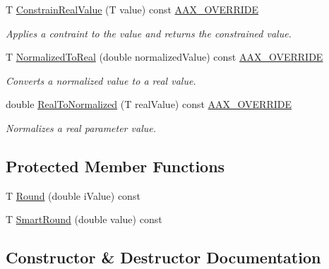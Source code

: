 \begin{DoxyCompactItemize}
T \mbox{\hyperlink{a01557_aecea5b86d9f5c6a5b1af87ba04d8473d}{Constrain\+Real\+Value}} (T value) const \mbox{\hyperlink{a00392_ac2f24a5172689ae684344abdcce55463}{A\+A\+X\+\_\+\+O\+V\+E\+R\+R\+I\+DE}}
\begin{DoxyCompactList}\small\item\em Applies a contraint to the value and returns the constrained value. \end{DoxyCompactList}\item 
T \mbox{\hyperlink{a01557_a50b58efa795c9973ab199d4f5bb31de4}{Normalized\+To\+Real}} (double normalized\+Value) const \mbox{\hyperlink{a00392_ac2f24a5172689ae684344abdcce55463}{A\+A\+X\+\_\+\+O\+V\+E\+R\+R\+I\+DE}}
\begin{DoxyCompactList}\small\item\em Converts a normalized value to a real value. \end{DoxyCompactList}\item 
double \mbox{\hyperlink{a01557_a457a42ac3e78debf4c595ac1afeec7cf}{Real\+To\+Normalized}} (T real\+Value) const \mbox{\hyperlink{a00392_ac2f24a5172689ae684344abdcce55463}{A\+A\+X\+\_\+\+O\+V\+E\+R\+R\+I\+DE}}
\begin{DoxyCompactList}\small\item\em Normalizes a real parameter value. \end{DoxyCompactList}\end{DoxyCompactItemize}
\subsection*{Protected Member Functions}
\begin{DoxyCompactItemize}
\item 
T \mbox{\hyperlink{a01557_a67b913916d7296ad69bf262363704e6f}{Round}} (double i\+Value) const
\item 
T \mbox{\hyperlink{a01557_a4b0c76eb0cd262598dbe5118068fbefb}{Smart\+Round}} (double value) const
\end{DoxyCompactItemize}


\subsection{Constructor \& Destructor Documentation}
\mbox{\label{a01557_a06236d6426f76ff4f7a1d51e9dec5b8c}} 

